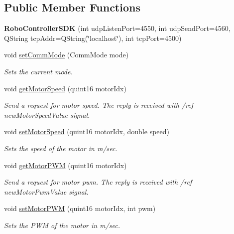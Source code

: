 \subsection*{Public Member Functions}
\begin{DoxyCompactItemize}
\item 
\hypertarget{classroboctrl_1_1_robo_controller_s_d_k_a635f633e0d4f0fe8e4da355ded900f61}{{\bfseries Robo\-Controller\-S\-D\-K} (int udp\-Listen\-Port=4550, int udp\-Send\-Port=4560, Q\-String tcp\-Addr=Q\-String(\char`\"{}localhost\char`\"{}), int tcp\-Port=4500)}\label{classroboctrl_1_1_robo_controller_s_d_k_a635f633e0d4f0fe8e4da355ded900f61}

\item 
void \hyperlink{classroboctrl_1_1_robo_controller_s_d_k_aa7e543c9ab8421375f84670184f56168}{set\-Comm\-Mode} (Comm\-Mode mode)
\begin{DoxyCompactList}\small\item\em Sets the current mode. \end{DoxyCompactList}\item 
void \hyperlink{classroboctrl_1_1_robo_controller_s_d_k_a8ff3ba7952c40e6249d6d76ed5e2d5ee}{get\-Motor\-Speed} (quint16 motor\-Idx)
\begin{DoxyCompactList}\small\item\em Send a request for motor speed. The reply is received with /ref new\-Motor\-Speed\-Value signal. \end{DoxyCompactList}\item 
void \hyperlink{classroboctrl_1_1_robo_controller_s_d_k_a975191d6bb8f097e49f3f4a523925550}{set\-Motor\-Speed} (quint16 motor\-Idx, double speed)
\begin{DoxyCompactList}\small\item\em Sets the speed of the motor in m/sec. \end{DoxyCompactList}\item 
void \hyperlink{classroboctrl_1_1_robo_controller_s_d_k_a25ae4287aa49003c5430a0f80870308a}{get\-Motor\-P\-W\-M} (quint16 motor\-Idx)
\begin{DoxyCompactList}\small\item\em Send a request for motor pwm. The reply is received with /ref new\-Motor\-Pwm\-Value signal. \end{DoxyCompactList}\item 
void \hyperlink{classroboctrl_1_1_robo_controller_s_d_k_a4a83d1bb367572c1d0d364eb49fb95ab}{set\-Motor\-P\-W\-M} (quint16 motor\-Idx, int pwm)
\begin{DoxyCompactList}\small\item\em Sets the P\-W\-M of the motor in m/sec. \end{DoxyCompactList}\item 

\end{DoxyCompactItemize}
